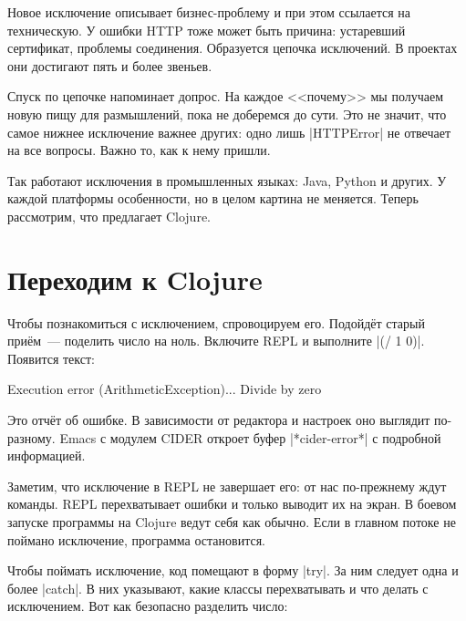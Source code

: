 
Новое исключение описывает бизнес-проблему и при этом ссылается на
техническую. У ошибки HTTP тоже может быть причина: устаревший сертификат,
проблемы соединения. Образуется цепочка исключений. В проектах они достигают
пять и более звеньев.

Спуск по цепочке напоминает допрос. На каждое <<почему>> мы получаем новую пищу
для размышлений, пока не доберемся до сути. Это не значит, что самое нижнее
исключение важнее других: одно лишь \spverb|HTTPError| не отвечает на все
вопросы. Важно то, как к нему пришли.

Так работают исключения в промышленных языках: Java, Python и других. У каждой
платформы особенности, но в целом картина не меняется. Теперь рассмотрим, что
предлагает Clojure.

\section{Переходим к Clojure}

Чтобы познакомиться с исключением, спровоцируем его. Подойд\"{е}т старый
при\"{е}м~--- поделить число на ноль. Включите REPL и выполните
\spverb|(/ 1 0)|. Появится текст:


\begin{english}
  \begin{text}
Execution error (ArithmeticException)...
Divide by zero
  \end{text}
\end{english}

Это отч\"{е}т об ошибке. В зависимости от редактора и настроек оно выглядит
по-разному. Emacs с модулем CIDER откроет буфер \spverb|*cider-error*|
с подробной информацией.


Заметим, что исключение в REPL не завершает его: от нас по-прежнему ждут
команды. REPL перехватывает ошибки и только выводит их на экран. В боевом
запуске программы на Clojure ведут себя как обычно. Если в главном потоке не
поймано исключение, программа остановится.

Чтобы поймать исключение, код помещают в форму \spverb|try|. За ним следует одна
и более \spverb|catch|. В них указывают, какие классы перехватывать и что делать
с исключением. Вот как безопасно разделить число:


